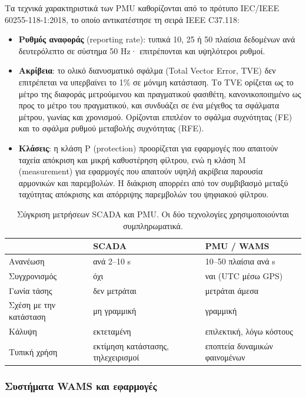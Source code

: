 Τα τεχνικά χαρακτηριστικά των PMU καθορίζονται από το πρότυπο IEC/IEEE 60255-118-1:2018, το
οποίο αντικατέστησε τη σειρά IEEE C37.118:

\begin{itemize}
\item \textbf{Ρυθμός αναφοράς} (reporting rate): τυπικά 10, 25 ή 50 πλαίσια δεδομένων ανά
      δευτερόλεπτο σε σύστημα 50 Hz· επιτρέπονται και υψηλότεροι ρυθμοί.
\item \textbf{Ακρίβεια}: το ολικό διανυσματικό σφάλμα (Total Vector Error, TVE) δεν
      επιτρέπεται να υπερβαίνει το 1\% σε μόνιμη κατάσταση. Το TVE ορίζεται ως το μέτρο της
      διαφοράς μετρούμενου και πραγματικού φασιθέτη, κανονικοποιημένο ως προς το μέτρο του
      πραγματικού, και συνδυάζει σε ένα μέγεθος τα σφάλματα μέτρου, γωνίας και χρονισμού.
      Ορίζονται επιπλέον το σφάλμα συχνότητας (FE) και το σφάλμα ρυθμού μεταβολής
      συχνότητας (RFE).
\item \textbf{Κλάσεις}: η κλάση P (protection) προορίζεται για εφαρμογές που απαιτούν ταχεία
      απόκριση και μικρή καθυστέρηση φίλτρου, ενώ η κλάση M (measurement) για εφαρμογές
      που απαιτούν υψηλή ακρίβεια παρουσία αρμονικών και παρεμβολών. Η διάκριση απορρέει
      από τον συμβιβασμό μεταξύ ταχύτητας απόκρισης και απόρριψης παρεμβολών του
      ψηφιακού φίλτρου.
\end{itemize}

\begin{table}[!htbp]
\centering
\begin{tabular}{lll}
\hline
 & SCADA & PMU / WAMS \\
\hline
Ανανέωση         & ανά 2--10 s        & 10--50 πλαίσια ανά s \\
Συγχρονισμός     & όχι                & ναι (UTC μέσω GPS) \\
Γωνία τάσης      & δεν μετράται       & μετράται άμεσα \\
Σχέση με την κατάσταση & μη γραμμική & γραμμική \\
Κάλυψη           & εκτεταμένη         & επιλεκτική, λόγω κόστους \\
Τυπική χρήση     & εκτίμηση κατάστασης, τηλεχειρισμοί & εποπτεία δυναμικών φαινομένων \\
\hline
\end{tabular}
\caption{Σύγκριση μετρήσεων SCADA και PMU. Οι δύο τεχνολογίες χρησιμοποιούνται
συμπληρωματικά.}
\label{tab:scada-pmu}
\end{table}

\subsubsection*{Συστήματα WAMS και εφαρμογές}

